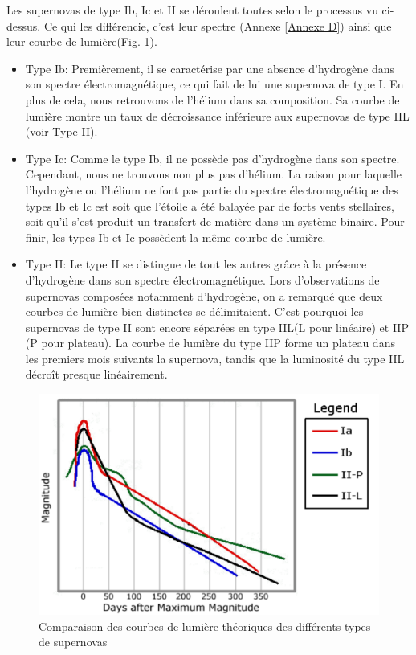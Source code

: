 Les supernovas de type Ib, Ic et II se déroulent toutes selon le processus vu ci-dessus. Ce qui les différencie, c'est leur spectre (Annexe \ref{Annexe D}) ainsi que leur courbe de lumière\footnotemark[1] (Fig. \ref{Fig. 3.1}).\bigskip

\begin{itemize}
	
	\item Type Ib: Premièrement, il se caractérise par une absence d'hydrogène dans son spectre électromagnétique, ce qui fait de lui une supernova de type I. En plus de cela, nous retrouvons de l'hélium dans sa composition. Sa courbe de lumière montre un taux de décroissance inférieure aux supernovas de type IIL (voir Type II).
	
	\item Type Ic: Comme le type Ib, il ne possède pas d'hydrogène dans son spectre. Cependant, nous ne trouvons non plus pas d'hélium. La raison pour laquelle l'hydrogène ou l'hélium ne font pas partie du spectre électromagnétique des types Ib et Ic est soit que l'étoile a été balayée par de forts vents stellaires, soit qu'il s'est produit un transfert de matière dans un système binaire. Pour finir, les types Ib et Ic possèdent la même courbe de lumière.
	
	\item Type II: Le type II se distingue de tout les autres grâce à la présence d'hydrogène dans son spectre électromagnétique. Lors d'observations de supernovas composées notamment d'hydrogène, on a remarqué que deux courbes de lumière bien distinctes se délimitaient. C'est pourquoi les supernovas de type II sont encore séparées en type IIL(L pour linéaire) et IIP (P pour plateau). La courbe de lumière du type IIP forme un plateau dans les premiers mois suivants la supernova, tandis que la luminosité du type IIL décroît presque linéairement.
	
\end{itemize}

\begin{figure}[H]
	\centering
	\includegraphics[scale=0.33]{images/lightcurves}
	\caption[Comparaison des courbes de lumière théoriques des différents types de supernovas]{Comparaison des courbes de lumière théoriques des différents types de supernovas }
	\label{Fig. 3.1}
\end{figure}

